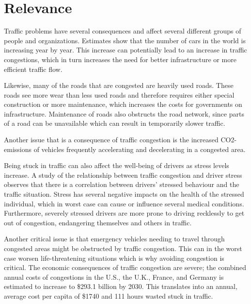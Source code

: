 \section{Relevance}
Traffic problems have several consequences and affect several different groups of people and organizations. Estimates show that the number of cars in the world is increasing year by year\cite{WardsAuto:CarPopulation}. This increase can potentially lead to an increase in traffic congestions, which in turn increases the need for better infrastructure or more efficient traffic flow.

Likewise, many of the roads that are congested are heavily used roads. These roads see more wear than less used roads and therefore requires either special construction or more maintenance, which increases the costs for governments on infrastructure. Maintenance of roads also obstructs the road network, since parts of a road can be unavailable which can result in temporarily slower traffic.

Another issue that is a consequence of traffic congestion is the increased CO2-emissions of vehicles frequently accelerating and decelerating in a congested area\cite{BarthBoriboonsomsin2009}.

Being stuck in traffic can also affect the well-being of drivers as stress levels increase. A study of the relationship between traffic congestion and driver stress observes that there is a correlation between drivers' stressed behaviour and the traffic situation\cite{HennesyWiesenthal1997,StokolsNovacoStokolsCampell1978}. Stress has several negative impacts on the health of the stressed individual, which in worst case can cause or influence several medical conditions. Furthermore, severely stressed drivers are more prone to driving recklessly to get out of congestion, endangering themselves and others in traffic\cite{Shinar1998}.

Another critical issue is that emergency vehicles needing to travel through congested areas might be obstructed by traffic congestion. This can in the worst case worsen life-threatening situations which is why avoiding congestion is critical.
The economic consequences of traffic congestion are severe; the combined annual costs of congestions in the U.S., the U.K., France, and Germany is estimated to increase to \$293.1 billion by 2030\cite{INRIX2013}. This translates into an annual, average cost per capita of \$1740 and 111 hours wasted stuck in traffic.

